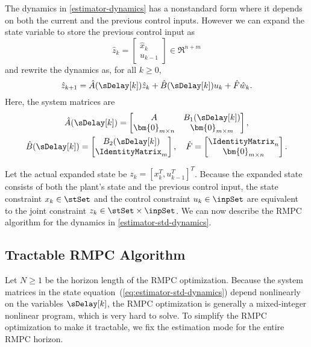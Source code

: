 The dynamics in \eqref{estimator-dynamics} has a nonstandard form
where it depends on both the current and the previous control inputs.
However we can expand the state variable to store the previous control
input as
\[
\hat{z}_{k}=\begin{bmatrix}\hat{x}_{k}\\
u_{k-1}
\end{bmatrix}\in\Re^{n+m}
\]
and rewrite the dynamics as, for all $k\geq0$,
\begin{equation}
\hat{z}_{k+1}=\hat{A}(\sDelay[k])\hat{z}_{k}+\hat{B}(\sDelay[k])u_{k}+\hat{F}\hat{w}_{k}\text{.}\label{eq:estimator-std-dynamics}
\end{equation}
Here, the system matrices are
\begin{equation}
\begin{gathered}
\hat{A}(\sDelay[k])=\begin{bmatrix}A & B_{1}(\sDelay[k])\\
\bm{0}_{m\times n} & \bm{0}_{m\times m}
\end{bmatrix},\\
\hat{B}(\sDelay[k])=\begin{bmatrix}B_{2}(\sDelay[k])\\
\IdentityMatrix_{m}
\end{bmatrix},\quad\hat{F}=\begin{bmatrix}\IdentityMatrix_{n}\\
\bm{0}_{m\times n}
\end{bmatrix}\text{.}
\end{gathered}
\label{eq:lifted-matrices}
\end{equation}

Let the actual expanded state be $z_{k}=\left[x_{k}^{T},u_{k-1}^{T}\right]^{T}$.
Because the expanded state consists of both the plant's state and
the previous control input, the state constraint $x_{k}\in \stSet$
and the control constraint $u_{k}\in\inpSet$ are equivalent to the
joint constraint $z_{k}\in\stSet\times\inpSet$. We can now describe
the RMPC algorithm for the dynamics in \eqref{estimator-std-dynamics}.


\subsection{Tractable RMPC Algorithm}

Let $N\geq1$ be the horizon length of the RMPC optimization. Because the system
matrices in the state equation~(\ref{eq:estimator-std-dynamics})
depend nonlinearly on the variables $\sDelay[k]$, the RMPC optimization
is generally a mixed-integer nonlinear program, which is very hard
to solve. To simplify the RMPC optimization to make it tractable, we fix the estimation mode for the entire RMPC horizon.

